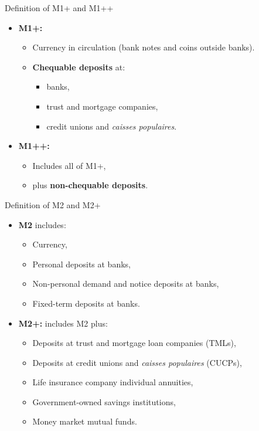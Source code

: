 \documentclass[aspectratio=169]{beamer}
\begin{document}
\begin{frame}{Definition of M1+ and M1++}
\transfade
\begin{itemize}[<+->]
  \item \textbf{M1+:}
  \begin{itemize}[<+->]
    \item Currency in circulation (bank notes and coins outside banks).
    \item \textbf{Chequable deposits} at:
    \begin{itemize}[<+->]
      \item banks,
      \item trust and mortgage companies,
      \item credit unions and \emph{caisses populaires}.
    \end{itemize}
  \end{itemize}
  \item \textbf{M1++:}
  \begin{itemize}[<+->]
    \item Includes all of M1+,
    \item plus \textbf{non-chequable deposits}.
  \end{itemize}
\end{itemize}
\end{frame}

\begin{frame}{Definition of M2 and M2+}
\transfade
\begin{itemize}[<+->]
  \item \textbf{M2} includes:
  \begin{itemize}[<+->]
    \item Currency,
    \item Personal deposits at banks,
    \item Non-personal demand and notice deposits at banks,
    \item Fixed-term deposits at banks.
  \end{itemize}
  \item \textbf{M2+:} includes M2 plus:
  \begin{itemize}[<+->]
    \item Deposits at trust and mortgage loan companies (TMLs),
    \item Deposits at credit unions and \emph{caisses populaires} (CUCPs),
    \item Life insurance company individual annuities,
    \item Government-owned savings institutions,
    \item Money market mutual funds.
  \end{itemize}
\end{itemize}
\end{frame}
\end{document}
